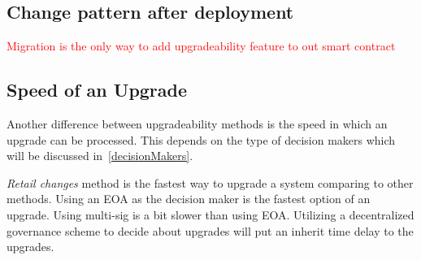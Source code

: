 



\subsection{Change pattern after deployment}

\textcolor{red}{Migration is the only way to add upgradeability feature to out smart contract}








\subsection{Speed of an Upgrade}
 
 
Another difference between upgradeability methods is the speed in which an upgrade can be processed. This depends on the type of decision makers which will be discussed in~\ref{decisionMakers}. 

\textit{Retail changes} method is the fastest way to upgrade a system comparing to other methods. Using an EOA as the decision maker is the fastest option of an upgrade. Using multi-sig is a bit slower than using EOA. Utilizing a decentralized governance scheme to decide about upgrades will put an inherit time delay to the upgrades.

